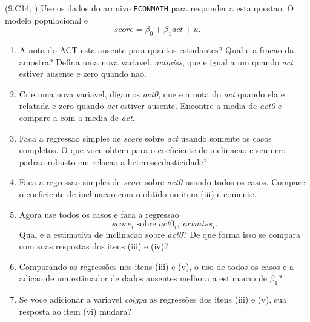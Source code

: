\documentclass[12pt,letterpaper, onecolumn]{exam}
\begin{document}
\begin{questions}
\vspace{0.7cm}

\question\qstar (9.C14, \citep{wooldridge2016}) Use os dados do arquivo \texttt{ECONMATH} para responder a esta questao. O modelo populacional e
\[
score=\beta_0+\beta_1 act+u.
\]
\begin{enumerate}[label=(\roman*)]
    \item A nota do ACT esta ausente para quantos estudantes? Qual e a fracao da amostra? Defina uma nova variavel, \textit{actmiss}, que e igual a um quando \textit{act} estiver ausente e zero quando nao.
    \item Crie uma nova variavel, digamos \textit{act0}, que e a nota do \textit{act} quando ela e relatada e zero quando \textit{act} estiver ausente. Encontre a media de \textit{act0} e compare-a com a media de \textit{act}.
    \item Faca a regressao simples de \textit{score} sobre \textit{act} usando somente os casos completos. O que voce obtem para o coeficiente de inclinacao e seu erro padrao robusto em relacao a heteroscedasticidade?
    \item Faca a regressao simples de \textit{score} sobre \textit{act0} usando todos os casos. Compare o coeficiente de inclinacao com o obtido no item (iii) e comente.
    \item Agora use todos os casos e faca a regressao
    \[
    score_i \text{ sobre } act0_i,\; actmiss_i.
    \]
    Qual e a estimativa de inclinacao sobre \textit{act0}? De que forma isso se compara com suas respostas dos itens (iii) e (iv)?
    \item Comparando as regressões nos itens (iii) e (v), o uso de todos os casos e a adicao de um estimador de dados ausentes melhora a estimacao de \(\beta_1\)?
    \item Se voce adicionar a variavel \textit{colgpa} as regressões dos itens (iii) e (v), sua resposta ao item (vi) mudara?
\end{enumerate}

\end{questions}
\newpage


\end{document}
